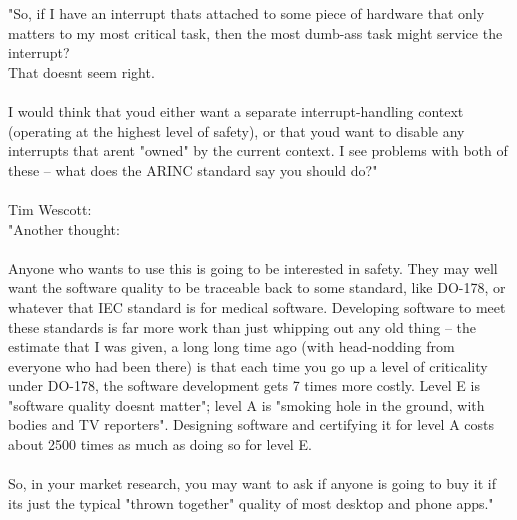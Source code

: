 "So, if I have an interrupt that\textquotesingle s attached to some piece of hardware that only matters to my most
critical task, then the most dumb-ass task might service the interrupt?\\
That doesn\textquotesingle t seem right.\\
\\

I would think that you\textquotesingle d either want a separate interrupt-handling context (operating at the highest level
of safety), or that you\textquotesingle d want to disable any interrupts that aren\textquotesingle t "owned" by the current context.  I
see problems with both of these -- what does the ARINC standard say you should do?"\\
\\
Tim Wescott:\\
"Another thought:\\
\\

Anyone who wants to use this is going to be interested in safety.  They may well want the software quality
to be traceable back to some standard, like DO-178, or whatever that IEC standard is for medical software.
Developing software to meet these standards is far more work than just whipping out any old thing -- the
estimate that I was given, a long long time ago (with head-nodding from everyone who had been there) is
that each time you go up a level of criticality under DO-178, the software development gets 7 times more
costly.  Level E is "software quality doesn\textquotesingle t matter"; level A is "smoking hole in the ground, with bodies
and TV reporters".  Designing software and certifying it for level A costs about 2500 times as much as
doing so for level E.\\
\\

So, in your market research, you may want to ask if anyone is going to buy it if it\textquotesingle s just the typical "thrown together" quality of most desktop and phone apps."\\
